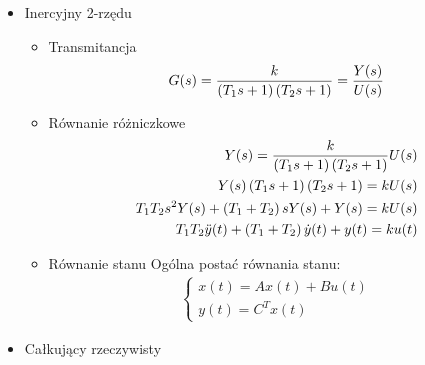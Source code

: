 \documentclass[a4paper,10pt]{article}
\begin{document}
\begin{itemize}
\item Inercyjny 2-rzędu
\begin{itemize}
\item Transmitancja
	\begin{eqnarray}
		G(s)= {k \over \left({T_{1}s + 1}\right) \left({T_{2}s + 1}\right)} = {Y(s) \over U(s)}
	\end{eqnarray}
\item Równanie różniczkowe
	\begin{eqnarray}
		\nonumber Y(s) = {k \over {\left({T_{1}s + 1}\right) \left({T_{2}s + 1}\right)}} U(s)\\
		\nonumber Y(s)\left({T_{1}s + 1}\right) \left({T_{2}s + 1}\right)= kU(s)\\
		\nonumber T_{1}T_{2}s^{2}Y(s) + \left({T_{1} + T_{2}}\right) s Y(s) + Y(s)= kU(s)\\
		T_{1}T_{2}\ddot{y}(t) + \left({T_{1} + T_{2}}\right) \dot{y}(t) + y(t)= k u(t)
	\end{eqnarray}
\item Równanie stanu
\newline Ogólna postać równania stanu:
	\begin{eqnarray}
		\nonumber \left\{
			\begin{array}{l}
				x(t) = Ax(t) + Bu(t)\\
				y(t) = C^{T}x(t)
			\end{array} \right.
	\end{eqnarray}
	
	
\end{itemize}

\item Całkujący rzeczywisty


\end{itemize}
\end{document}
